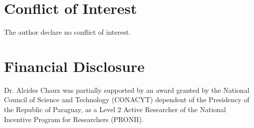 \documentclass[11pt,letterpaper]{article}\usepackage[]{graphicx}\usepackage[]{color}
\begin{document}
\begin{multicols}{2}
\section*{Conflict of Interest}
The author declare no conflict of interest.

\section*{Financial Disclosure}
Dr. Alcides Chaux was partially supported by an award granted by the National Council of Science and Technology (CONACYT) dependent of the Presidency of the Republic of Paraguay, as a Level 2 Active Researcher of the National Incentive Program for Researchers (PRONII).




\end{multicols}
\end{document}
